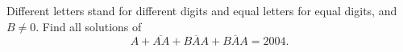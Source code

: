 Different letters stand for different digits and equal letters for equal digits, and $B\ne0$. Find all solutions of
\[
A+\overline{AA}+\overline{BAA}+\overline{BAA}=2004 .
\]
